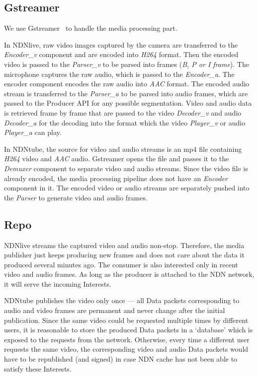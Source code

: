 \subsection{Gstreamer}

We use Gstreamer~\cite{gstreamer} to handle the media processing part. 

In NDNlive, raw video images captured by the camera are transferred to the \textit{Encoder\_v} component and are encoded into \textit{H264} format. Then the encoded video is passed to the \textit{Parser\_v} to be parsed into frames (\textit{B, P or I frame}). The microphone captures the raw audio, which is passed to the \textit{Encoder\_a}. The encoder component encodes the raw audio into \textit{AAC} format. The encoded audio stream is transferred to the \textit{Parser\_a} to be parsed into audio frames, which are passed to the Producer API for any possible segmentation. Video and audio data is retrieved frame by frame that are passed to the video \textit{Decoder\_v} and audio \textit{Decoder\_a} for the decoding into the format which the video \textit{Player\_v} or audio \textit{Player\_a} can play.

In NDNtube, the source for video and audio streams is an mp4 file containing \textit{H264} video and \textit{AAC} audio. Gstreamer opens the file and passes it to the \textit{Demuxer} component to separate video and audio streams. Since the video file is already encoded, the media processing pipeline does not have an \textit{Encoder} component in it. The encoded video or audio streams are separately pushed into the \textit{Parser} to generate video and audio frames.


\subsection{Repo}
\label{sec:repo}
NDNlive streams the captured video and audio non-stop. Therefore, the media publisher just keeps producing new frames and does not care about the data it produced several minutes ago. The consumer is also interested only in recent video and audio frames. As long as the producer is attached to the NDN network, it  will serve the incoming Interests. %

NDNtube publishes the video only once --- all Data packets corresponding to audio and video frames are permanent and never change after the initial publication. Since the same video could be requested multiple times by different users, it is reasonable to store the produced Data packets in a `database' which is exposed to the requests from the network. Otherwise, every time a different user requests the same video, the corresponding video and audio Data packets would have to be republished (and signed) in case NDN cache has not been able to satisfy these Interests.

